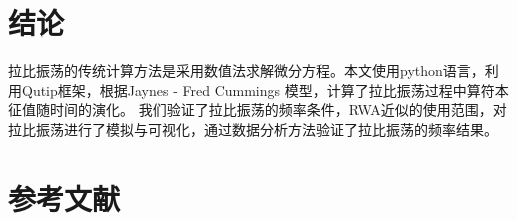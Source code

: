 \documentclass{ctexart}
\begin{document}
\section{结论}
拉比振荡的传统计算方法是采用数值法求解微分方程。本文使用python语言，利用Qutip框架，根据Jaynes - Fred Cummings 模型，计算了拉比振荡过程中算符本征值随时间的演化。
我们验证了拉比振荡的频率条件，RWA近似的使用范围，对拉比振荡进行了模拟与可视化，通过数据分析方法验证了拉比振荡的频率结果。
\section{参考文献}
\printbibliography[heading=none]
\end{document}
